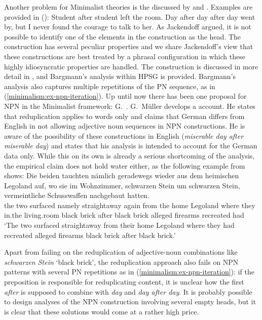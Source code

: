 \documentclass[output=paper
                ,modfonts
                ,nonflat
	        ,collection
	        ,collectionchapter
	        ,collectiontoclongg
 	        ,biblatex
                ,babelshorthands
                ,newtxmath
                ,draftmode
                ,colorlinks, citecolor=brown
]{./langsci/langscibook}
\begin{document}
Another problem for Minimalist theories is the  discussed by \citet{Matsuyama2004a} and \citet{Jackendoff2008a}. Examples are provided in ():
\eal
\ex Student after student left the room.
\ex
\label{minimalism:ex-npn-iteration}
Day after day after day went by, but I never found the courage to talk to
her. \citep{Bargmann2015a}
\zl
As Jackendoff argued, it is not possible to identify one of the elements in the construction as the
head. The construction has several peculiar properties and we share Jackendoff's view that these
constructions are best treated by a phrasal configuration in which these highly idiosyncratic
properties are handled. The construction is discussed in more detail in , and
Bargmann's analysis within HPSG is provided. Bargmann's analysis also captures multiple repetitions
of the PN sequence, as in (\ref{minimalism:ex-npn-iteration}). Up until now there has been one proposal for NPN in the Minimalist framework:
G.\ \citet{GMueller2011a}. G.\ Müller develops a  account. He states that reduplication
applies to words only and claims that German differs from English in not allowing adjective noun
sequences in NPN constructions. He is aware of the possibility of these constructions in English
(\emph{miserable day after miserable day}) and states that his analysis is intended to account for
the German data only. While this on its own is already a serious shortcoming of the analysis, the empirical claim
does not hold water either, as the following example from  shows:
\ea
\gll Die beiden tauchten nämlich geradewegs wieder aus dem heimischen Legoland auf, wo sie im
Wohnzimmer, schwarzen Stein um schwarzen Stein, vermeintliche Schusswaffen nachgebaut
hatten.\footnotemark\\
     the two    surfaced namely straightaway again   from the home Legoland \particle{} where they
     in.the living.room black brick after black brick alleged firearms recreated had\\%
{}
\glt `The two surfaced straightaway from their home Legoland where they had recreated alleged
firearms black brick after black brick.'
\z
\begin{sloppypar}
Apart from failing on the reduplication of adjective-noun combinations like \emph{schwar\-zen Stein}
`black brick', the reduplication approach also fails on NPN patterns with several PN repetitions as
in (\ref{minimalism:ex-npn-iteration}): if the preposition is responsible for reduplicating content, it is
unclear how the first \emph{after} is supposed to combine with \emph{day} and \emph{day after
  day}. It is probably possible to design analyses of the NPN construction involving
several empty heads, but it is clear that these solutions would come at a rather high price.
\end{sloppypar}
\end{document}
